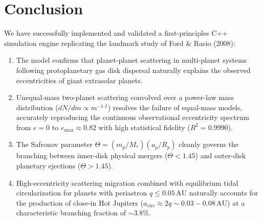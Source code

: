 \documentclass[11pt,a4paper]{article}
\begin{document}
\section{Conclusion}
We have successfully implemented and validated a first-principles C++ simulation engine replicating the landmark study of Ford \& Rasio (2008):
\begin{enumerate}
    \item The model confirms that planet-planet scattering in multi-planet systems following protoplanetary gas disk dispersal naturally explains the observed eccentricities of giant extrasolar planets.
    \item Unequal-mass two-planet scattering convolved over a power-law mass distribution ($dN/dm \propto m^{-1.1}$) resolves the failure of equal-mass models, accurately reproducing the continuous observational eccentricity spectrum from $e = 0$ to $e_{\text{max}} \approx 0.82$ with high statistical fidelity ($R^2 = 0.9990$).
    \item The Safronov parameter $\Theta = (m_p/M_*)(a_p/R_p)$ cleanly governs the branching between inner-disk physical mergers ($\Theta < 1.45$) and outer-disk planetary ejections ($\Theta > 1.45$).
    \item High-eccentricity scattering migration combined with equilibrium tidal circularization for planets with periastron $q \le 0.05\,\text{AU}$ naturally accounts for the production of close-in Hot Jupiters ($a_{\text{circ}} \approx 2q \sim 0.03 - 0.08\,\text{AU}$) at a characteristic branching fraction of $\sim 3.8\%$.
\end{enumerate}
\end{document}
